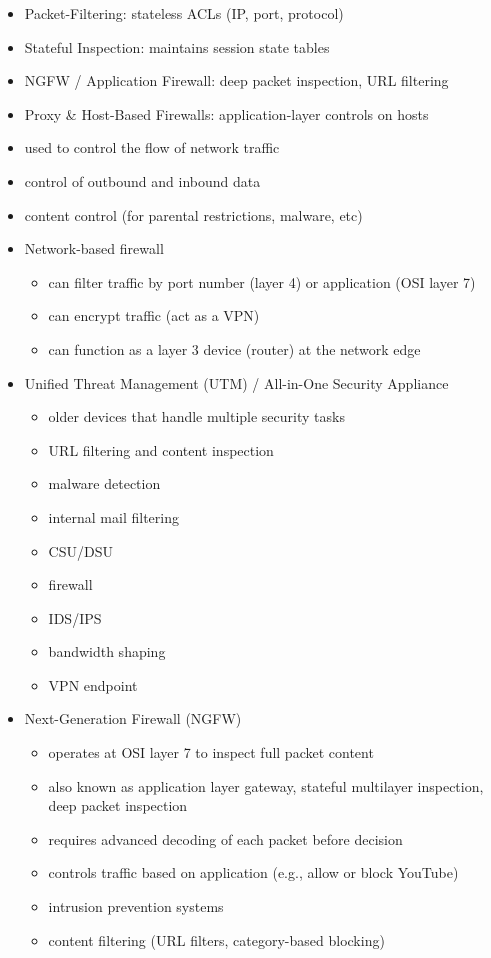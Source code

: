 \documentclass[11pt]{article}
\begin{document}
\begin{itemize}
\item Packet-Filtering: stateless ACLs (IP, port, protocol)
\item Stateful Inspection: maintains session state tables
\item NGFW / Application Firewall: deep packet inspection, URL filtering
\item Proxy \& Host-Based Firewalls: application-layer controls on hosts

\item used to control the flow of network traffic
\item control of outbound and inbound data
\item content control (for parental restrictions, malware, etc)

\item Network-based firewall
\begin{itemize}
\item can filter traffic by port number (layer 4) or application (OSI layer 7)
\item can encrypt traffic (act as a VPN)
\item can function as a layer 3 device (router) at the network edge
\end{itemize}

\item Unified Threat Management (UTM) / All-in-One Security Appliance
\begin{itemize}
\item older devices that handle multiple security tasks
\item URL filtering and content inspection
\item malware detection
\item internal mail filtering
\item CSU/DSU
\item firewall
\item IDS/IPS
\item bandwidth shaping
\item VPN endpoint
\end{itemize}

\item Next-Generation Firewall (NGFW)
\begin{itemize}
\item operates at OSI layer 7 to inspect full packet content
\item also known as application layer gateway, stateful multilayer inspection, deep packet inspection
\item requires advanced decoding of each packet before decision
\item controls traffic based on application (e.g., allow or block YouTube)
\item intrusion prevention systems
\item content filtering (URL filters, category-based blocking)
\end{itemize}


\end{itemize}
\end{document}
